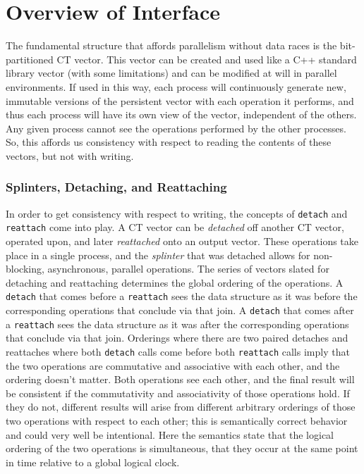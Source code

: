 \documentclass[pageno]{jpaper}
\begin{document}
\section{Overview of Interface}
The fundamental structure that affords parallelism without data races is the
bit-partitioned CT vector. This vector can be created and used like a C++
standard library vector (with some limitations) and can be modified at will in
parallel environments. If used in this way, each process will continuously
generate new, immutable versions of the persistent vector with each operation it
performs, and thus each process will have its own view of the vector,
independent of the others. Any given process cannot see the operations performed
by the other processes. So, this affords us consistency with respect to reading
the contents of these vectors, but not with writing.

\subsubsection{Splinters, Detaching, and Reattaching} In order to get consistency
with respect to writing, the concepts of \texttt{detach} and \texttt{reattach}
come into play. A CT vector can be \textit{detached} off another CT vector,
operated upon, and later \textit{reattached} onto an output vector. These
operations take place in a single process, and the \textit{splinter} that was
detached allows for non-blocking, asynchronous, parallel operations. The series
of vectors slated for detaching and reattaching determines the global ordering
of the operations. A \texttt{detach} that comes before a \texttt{reattach} sees
the data structure as it was before the corresponding operations that conclude
via that join. A \texttt{detach} that comes after a \texttt{reattach} sees the
data structure as it was after the corresponding operations that conclude via
that join. Orderings where there are two paired detaches and reattaches where
both \texttt{detach} calls come before both \texttt{reattach} calls imply that
the two operations are commutative and associative with each other, and the
ordering doesn't matter. Both operations see each other, and the final result
will be consistent if the commutativity and associativity of those operations
hold. If they do not, different results will arise from different arbitrary
orderings of those two operations with respect to each other; this is
semantically correct behavior and could very well be intentional.  Here the
semantics state that the logical ordering of the two operations is simultaneous,
that they occur at the same point in time relative to a global logical clock.
\end{document}
